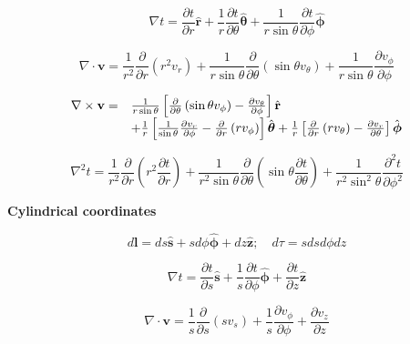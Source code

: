 \documentclass[11pt]{article}
\begin{document}
\[
\nabla t = \frac { \partial t } { \partial r } \hat { \mathbf { r } } + \frac { 1 } { r } \frac { \partial t } { \partial \theta } \hat { \boldsymbol { \theta } } + \frac { 1 } { r \sin \theta } \frac { \partial t } { \partial \phi } \hat { \boldsymbol { \phi } }
\]



\[
\nabla \cdot \mathbf { v } = \frac { 1 } { r ^ { 2 } } \frac { \partial } { \partial r } \left( r ^ { 2 } v _ { r } \right) + \frac { 1 } { r \sin \theta } \frac { \partial } { \partial \theta } \left( \sin \theta v _ { \theta } \right) + \frac { 1 } { r \sin \theta } \frac { \partial v _ { \phi } } { \partial \phi }
\]


\[
\begin{array} { r l } { \nabla \times \mathbf { v } = } & { \frac { 1 } { r \sin \theta } \left[ \frac { \partial } { \partial \theta } \left( \sin \theta v _ { \phi } \right) - \frac { \partial v _ { \theta } } { \partial \phi } \right] \hat { \mathbf { r } } } \\ { } & { + \frac { 1 } { r } \left[ \frac { 1 } { \sin \theta } \frac { \partial v _ { r } } { \partial \phi } - \frac { \partial } { \partial r } \left( r v _ { \phi } \right) \right] \hat { \boldsymbol { \theta } } + \frac { 1 } { r } \left[ \frac { \partial } { \partial r } \left( r v _ { \theta } \right) - \frac { \partial v _ { r } } { \partial \theta } \right] \hat { \boldsymbol { \phi } } } \end{array}
\]


\[
\nabla ^ { 2 } t = \frac { 1 } { r ^ { 2 } } \frac { \partial } { \partial r } \left( r ^ { 2 } \frac { \partial t } { \partial r } \right) + \frac { 1 } { r ^ { 2 } \sin \theta } \frac { \partial } { \partial \theta } \left( \sin \theta \frac { \partial t } { \partial \theta } \right) + \frac { 1 } { r ^ { 2 } \sin ^ { 2 } \theta } \frac { \partial ^ { 2 } t } { \partial \phi ^ { 2 } }
\]



{\bf Cylindrical coordinates}

\[
d \mathbf { l } = d s \hat { \mathbf { s } } + s d \phi \hat { \boldsymbol { \phi } } + d z \hat { \mathbf { z } } ; \quad d \tau = s d s d \phi d z
\]


\[
\nabla t = \frac { \partial t } { \partial s } \hat { \mathbf { s } } + \frac { 1 } { s } \frac { \partial t } { \partial \phi } \hat { \boldsymbol { \phi } } + \frac { \partial t } { \partial z } \mathbf { \hat { z } }
\]


\[
\nabla \cdot \mathbf { v } = \frac { 1 } { s } \frac { \partial } { \partial s } \left( s v _ { s } \right) + \frac { 1 } { s } \frac { \partial v _ { \phi } } { \partial \phi } + \frac { \partial v _ { z } } { \partial z }
\]
\end{document}
